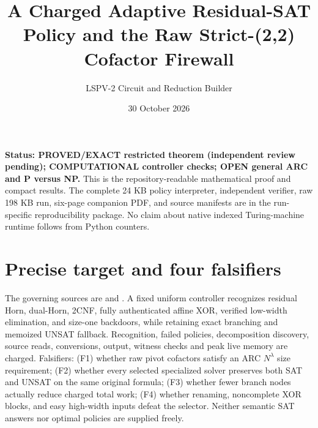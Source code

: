 \documentclass[11pt]{article}
\title{A Charged Adaptive Residual-SAT Policy and the Raw Strict-(2,2) Cofactor Firewall}
\author{LSPV-2 Circuit and Reduction Builder}
\date{30 October 2026}
\begin{document}
\maketitle
\noindent \textbf{Status: PROVED/EXACT restricted theorem (independent review pending);
COMPUTATIONAL controller checks; OPEN general ARC and P versus NP.}
This is the repository-readable mathematical proof and compact results.
The complete 24 KB policy interpreter, independent verifier, raw 198 KB run, six-page
companion PDF, and source manifests are in the run-specific reproducibility package.
No claim about native indexed Turing-machine runtime follows from Python counters.

\section{Precise target and four falsifiers}
The governing sources are
and .
A fixed uniform controller recognizes residual Horn, dual-Horn, 2CNF, fully
authenticated affine XOR, verified low-width elimination, and size-one
backdoors, while retaining exact branching and memoized UNSAT fallback.
Recognition, failed policies, decomposition discovery, source reads,
conversions, output, witness checks and peak live memory are charged.
Falsifiers: (F1) whether raw pivot cofactors satisfy an ARC $N^\lambda$ size
requirement; (F2) whether every selected specialized solver preserves
both SAT and UNSAT on the same original formula; (F3) whether fewer
branch nodes actually reduce charged total work; (F4) whether renaming,
noncomplete XOR blocks, and easy high-width inputs defeat the selector.
Neither semantic SAT answers nor optimal policies are supplied freely.
\end{document}
